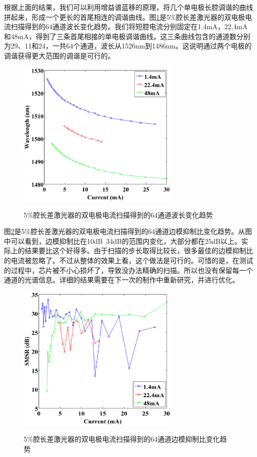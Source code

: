 \documentclass{ZJUthesis}
\begin{document}
根据上面的结果，我们可以利用增益谱蓝移的原理，将几个单电极长腔调谐的曲线拼起来，形成一个更长的首尾相连的调谐曲线。图\ref{fig_2d4}是5\%腔长差激光器的双电极电流扫描得到的64通道波长变化趋势。我们将短腔电流分别固定在1.4mA，22.4mA和48mA，得到了三条首尾相接的单电极调谐曲线。这三条曲线包含的通道数分别为29、11和24，一共64个通道，波长从1526nm到1486nm。这说明通过两个电极的调谐获得更大范围的调谐是可行的。

\begin{figure}[!ht]
  \centering
  \includegraphics[width=0.7\textwidth]{./Pictures/2d4.eps}\\
  \caption{5\%腔长差激光器的双电极电流扫描得到的64通道波长变化趋势}
  \label{fig_2d4}
\end{figure}

图\ref{fig_2d5}是5\%腔长差激光器的双电极电流扫描得到的64通道边模抑制比变化趋势。从图中可以看到，边模抑制比在10dB~34dB的范围内变化，大部分都在25dB以上。实际上的结果要比这个好得多。由于扫描的步长取得比较长，很多最佳的边模抑制比的电流被忽略了。不过从整体的效果上看，这个做法是可行的。可惜的是，在测试的过程中，芯片被不小心损坏了，导致没办法精确的扫描。所以也没有保留每一个通道的光谱信息。详细的结果需要在下一次的制作中重新研究，并进行优化。

\begin{figure}[!ht]
  \centering
  \includegraphics[width=0.7\textwidth]{./Pictures/2d5.eps}\\
  \caption{5\%腔长差激光器的双电极电流扫描得到的64通道边模抑制比变化趋势}
  \label{fig_2d5}
\end{figure}
\end{document}
